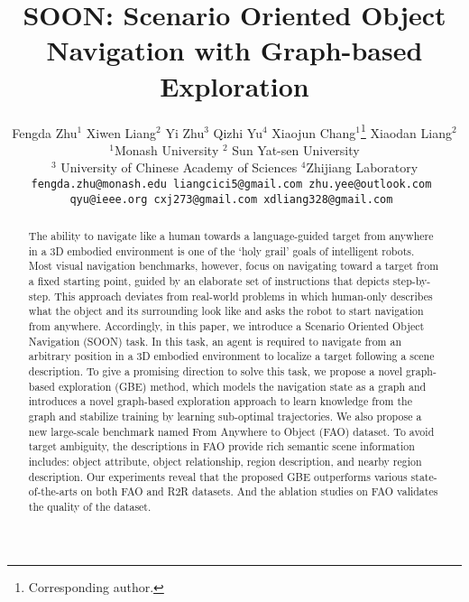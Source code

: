 \documentclass[final]{cvpr}
\begin{document}
\title{SOON: Scenario Oriented Object Navigation with Graph-based Exploration}


\author{Fengda Zhu$^1$\hspace{6mm}
Xiwen Liang$^2$\hspace{6mm}
Yi Zhu$^3$\hspace{6mm}
Qizhi Yu$^4$ \hspace{6mm}
Xiaojun Chang$^1$\thanks{Corresponding author.} \hspace{6mm}
Xiaodan Liang$^2$ \\
$^1$Monash University \hspace{2mm} $^2$ Sun Yat-sen University \\ $^3$ University of Chinese Academy of Sciences \hspace{2mm} $^4$Zhijiang Laboratory\\
{\tt\small fengda.zhu@monash.edu \hspace{2mm} liangcici5@gmail.com \hspace{2mm} zhu.yee@outlook.com } \\
{\tt\small qyu@ieee.org \hspace{2mm} cxj273@gmail.com \hspace{2mm} xdliang328@gmail.com }
}

\maketitle
\pagestyle{empty}
\thispagestyle{empty}

\begin{abstract}
   The ability to navigate like a human towards a language-guided target from anywhere in a 3D embodied environment is one of the `holy grail' goals of intelligent robots. Most visual navigation benchmarks, however, focus on navigating toward a target from a fixed starting point, guided by an elaborate set of instructions that depicts step-by-step. This approach deviates from real-world problems in which human-only describes what the object and its surrounding look like and asks the robot to start navigation from anywhere. Accordingly, in this paper, we introduce a Scenario Oriented Object Navigation (SOON) task. In this task, an agent is required to navigate from an arbitrary position in a 3D embodied environment to localize a target following a scene description. 
   To give a promising direction to solve this task, we propose a novel graph-based exploration (GBE) method, which models the navigation state as a graph and introduces a novel graph-based exploration approach to learn knowledge from the graph and stabilize training by learning sub-optimal trajectories. 
   We also propose a new large-scale benchmark named From Anywhere to Object (FAO) dataset. To avoid target ambiguity, the descriptions in FAO provide rich semantic scene information includes: object attribute, object relationship, region description, and nearby region description. Our experiments reveal that the proposed GBE outperforms various state-of-the-arts on both FAO and R2R datasets. And the ablation studies on FAO validates the quality of the dataset. 
\end{abstract}
\end{document}
